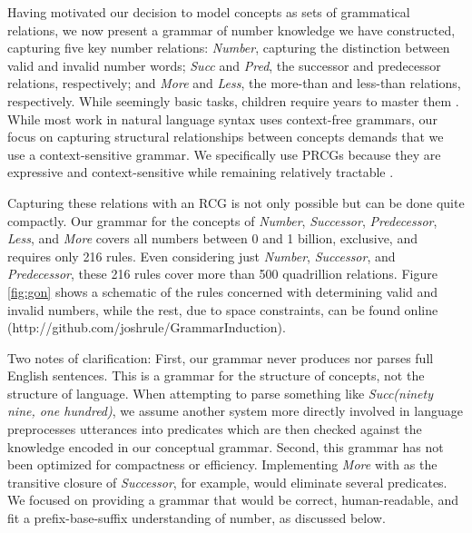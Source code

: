 \documentclass[10pt,letterpaper]{article}
\begin{document}
Having motivated our decision to model concepts as sets of grammatical
relations, we now present a grammar of number knowledge we have
constructed, capturing five key number relations: \emph{Number},
capturing the distinction between valid and invalid number words;
\emph{Succ} and \emph{Pred}, the successor and predecessor relations,
respectively; and \emph{More} and \emph{Less}, the more-than and
less-than relations, respectively. While seemingly basic tasks,
children require years to master them \citep{FusRicBriar1982}. While
most work in natural language syntax uses context-free grammars, our
focus on capturing structural relationships between concepts demands
that we use a context-sensitive grammar. We specifically use PRCGs
because they are expressive and context-sensitive while remaining
relatively tractable \citep{boullier2005range}.

Capturing these relations with an RCG is not only possible but can
be done quite compactly. Our grammar for the concepts of
\emph{Number}, \emph{Successor}, \emph{Predecessor}, \emph{Less}, and
\emph{More} covers all numbers between 0 and 1 billion, exclusive, and
requires only 216 rules. Even considering just \emph{Number},
\emph{Successor}, and \emph{Predecessor}, these 216 rules cover more
than 500 quadrillion relations. Figure \ref{fig:gon} shows a schematic
of the rules concerned with determining valid and invalid numbers,
while the rest, due to space constraints, can be found
online (http://github.com/joshrule/GrammarInduction).

Two notes of clarification: First, our grammar never produces nor
parses full English sentences. This is a grammar for the structure of
concepts, not the structure of language. When attempting to parse
something like \emph{Succ(ninety nine, one hundred)}, we assume
another system more directly involved in language preprocesses
utterances into predicates which are then checked against the
knowledge encoded in our conceptual grammar. Second, this grammar has
not been optimized for compactness or efficiency. Implementing
\emph{More} with as the transitive closure of \emph{Successor}, for
example, would eliminate several predicates. We focused on providing a
grammar that would be correct, human-readable, and fit a
prefix-base-suffix understanding of number, as discussed below.
\end{document}
